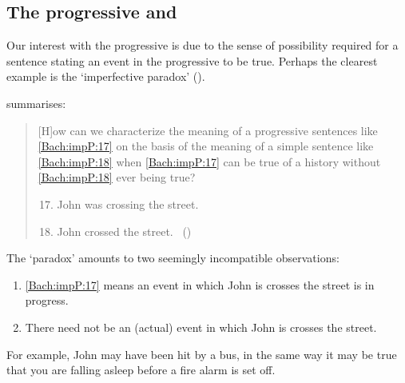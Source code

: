 \subsection{The progressive and \assuPP{}}

\begin{note}
  Our interest with the progressive is due to the sense of possibility required for a sentence stating an event in the progressive to be true.
  Perhaps the clearest example is the `imperfective paradox' (\cite[cf.][Ch.3.1]{Dowty:1979vq}).

  \citeauthor{Bach:1986tb} summarises:
  \begin{quote}
    [H]ow can we characterize the meaning of a progressive sentences like \ref{Bach:impP:17} on the basis of the meaning of a simple sentence like \ref{Bach:impP:18} when \ref{Bach:impP:17} can be true of a history without \ref{Bach:impP:18} ever being true?
    \begin{enumerate}[label=(\arabic*), ref=(\arabic*)]
      \setcounter{enumi}{16}
    \item
      \label{Bach:impP:17}
      John was crossing the street.
    \item
      \label{Bach:impP:18}
      John crossed the street.%
      \mbox{ }\hfill\mbox{(\citeyear[12]{Bach:1986tb})}
    \end{enumerate}
  \end{quote}

  The `paradox' amounts to two seemingly incompatible observations:
  \begin{enumerate}[noitemsep]
  \item
    \ref{Bach:impP:17} means an event in which John is crosses the street is in progress.
  \item
    There need not be an (actual) event in which John is crosses the street.
  \end{enumerate}

  For example, John may have been hit by a bus, in the same way it may be true that you are falling asleep before a fire alarm is set off.
\end{note}


